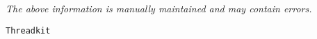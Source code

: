 \label{pkg:threadkit}

{\tiny \it The above information is manually maintained and may contain errors.}
\begin{verbatim}
Threadkit
\end{verbatim}

